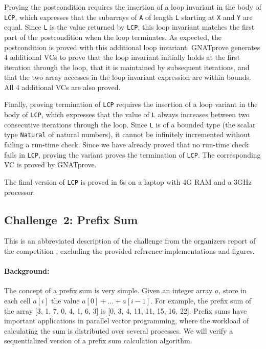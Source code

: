 \documentclass[sttt,final]{svjour}
\newcommand{\gnatprove}{GNATprove\xspace}
\begin{document}
Proving the postcondition requires the insertion of a loop invariant in the
body of \verb|LCP|, which expresses that the subarrays of \verb|A| of length
\verb|L| starting at \verb|X| and \verb|Y| are equal. Since \verb|L| is the
value returned by \verb|LCP|, this loop invariant matches the first part of the
postcondition when the loop terminates. As expected, the postcondition is
proved with this additional loop invariant. \gnatprove generates 4 additional
VCs to prove that the loop invariant initially holds at the first iteration
through the loop, that it is maintained by subsequent iterations, and that the
two array accesses in the loop invariant expression are within bounds. All 4
additional VCs are also proved.

Finally, proving termination of \verb|LCP| requires the insertion of a loop
variant in the body of \verb|LCP|, which expresses that the value of \verb|L|
always increases between two consecutive iterations through the loop. Since
\verb|L| is of a bounded type (the scalar type \verb|Natural| of natural
numbers), it cannot be infinitely incremented without failing a run-time
check. Since we have already proved that no run-time check fails in \verb|LCP|,
proving the variant proves the termination of \verb|LCP|. The corresponding VC
is proved by \gnatprove.

The final version of \verb|LCP| is proved in 6s on a laptop with 4G
RAM and a 3GHz processor.

\subsection{Challenge~2: Prefix Sum}
This is an abbreviated description of the challenge from the
organizers report of the competition \cite {verifythis2012}, excluding
the provided reference implementations and figures.
%
\paragraph{Background:}
The concept of a prefix sum is very simple. Given an integer array
$a$, store in each cell $a[i]$ the value $a[0] + \ldots + a[i-1]$.
For example, the prefix sum of the array [3, 1, 7, 0, 4, 1, 6, 3] is
[0, 3, 4, 11, 11, 15, 16, 22].
%
Prefix sums have important applications in parallel vector
programming, where the workload of calculating the sum is distributed
over several processes. We will verify a sequentialized version of a
prefix sum calculation algorithm.
%
\end{document}
